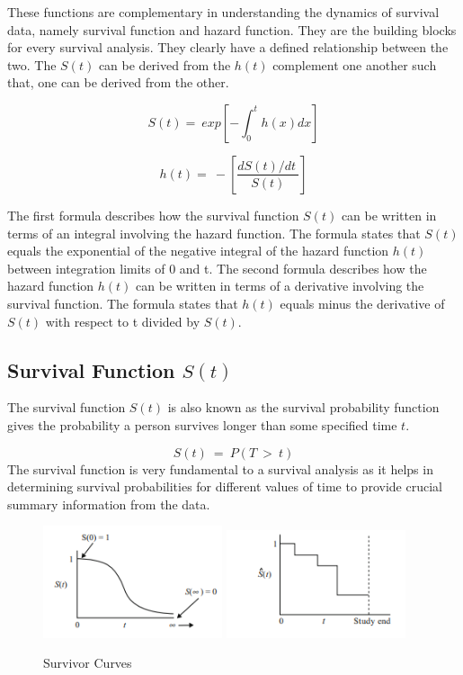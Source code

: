 \documentclass[12pt]{report}
\begin{document}
	These functions are complementary in understanding the dynamics of survival data, namely survival function and hazard function. They are the building blocks for every survival analysis. They clearly have a defined relationship between the two. The \(S\left(t\right)\) can be derived from the \(h\left(t\right)\) complement one another such that, one can be derived from the other.
	
	\[S\left(t\right)=\ exp\left[-\int_{0}^{t}{h(x)dx}\right]\]
	
	\[h\left(t\right)=\ -\left[\frac{dS\left(t\right)/dt\ }{S(t)}\right]\]
	
	
	
	The first formula describes how the survival function \(S\left(t\right)\) can be written in terms of an integral involving the hazard function. The formula states that \(S\left(t\right) \)equals the exponential of the negative integral of the hazard function \(h\left(t\right) \) between integration limits of 0 and t. 
	The second formula describes how the hazard function \(h\left(t\right) \) can be written in terms of a derivative involving the survival function. The formula states that \( h\left(t\right)\) equals minus the derivative of \(S\left(t\right) \) with respect to t divided by \(S\left(t\right)\).
	
	
	\subsection{\texorpdfstring{Survival Function \( S(t) \)}{Survival Function S(t)}}
	The survival function \(S\left(t\right) \) is also known as the survival probability function gives the probability a person survives longer than some specified time \( t\).
	
	\[S(t)\ =\ P(T\ >\ t)\]
	The survival function is very fundamental to a survival analysis as it helps in determining survival probabilities for different values of time  to provide crucial summary information from the data.
	\begin{figure}[H]
		\centering
		\includegraphics[width=0.47\textwidth]{Figure 3/3.31.png}
		\hfill
		\includegraphics[width=0.47\textwidth]{Figure 3/3.32.png}
		\caption{Survivor Curves}
		\label{Figure 3.3}
	\end{figure}
	
\end{document}
